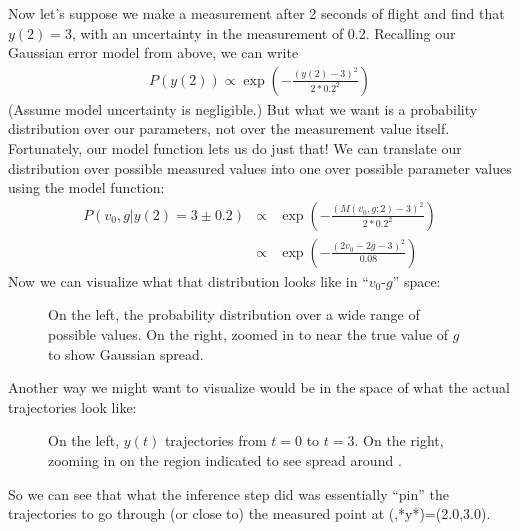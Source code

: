\documentclass[letterpaper,10pt,english]{sphinxmanual}
\begin{document}
Now let’s suppose we make a measurement after 2 seconds of flight and find that \(y(2)=3\), with an uncertainty in the measurement of 0.2. Recalling our Gaussian error model from above, we can write
\begin{equation}\label{equation:bayesics:bayesics:13}
\begin{split}P(y(2)) \propto \exp\left({-\frac{(y(2)-3)^2}{2*0.2^2}}\right)\end{split}
\end{equation}
(Assume model uncertainty is negligible.) But what we  want is a probability distribution over our parameters, not over the measurement value itself. Fortunately, our model function lets us do just that! We can translate our distribution over possible measured values into one over possible parameter values using the model function:
\begin{eqnarray}
  \label{equation:bayesics:condprob}
P(v_0, g | y(2)=3 \pm 0.2) & \propto & \exp\left({-\frac{(M(v_0,g;2)-3)^2}{2*0.2^2}}\right) \\
& \propto & \exp\left({-\frac{(2v_0 - 2g - 3)^2}{0.08}}\right)
\end{eqnarray}
Now we can visualize what that distribution looks like in “\(v_0\)-\(g\)” space:

\begin{figure}[htbp]
\centering
\capstart

\noindent{}
\caption{On the left, the probability distribution over a wide range of possible values. On the right, zoomed in to near the true value of \(g\) to show Gaussian spread.}\label{\detokenize{bayesics:id3}}\end{figure}

Another way we might want to visualize would be in the space of what the actual trajectories look like:

\begin{figure}[htbp]
\centering
\capstart

\noindent{}
\caption{On the left, \(y(t)\) trajectories from \(t=0\) to \(t=3\). On the right, zooming in on the region indicated to see spread around .}\label{\detokenize{bayesics:id4}}\end{figure}

So we can see that what the inference step did was essentially “pin” the trajectories to go through (or close to) the measured point at (,*y*)=(2.0,3.0).
\end{document}
